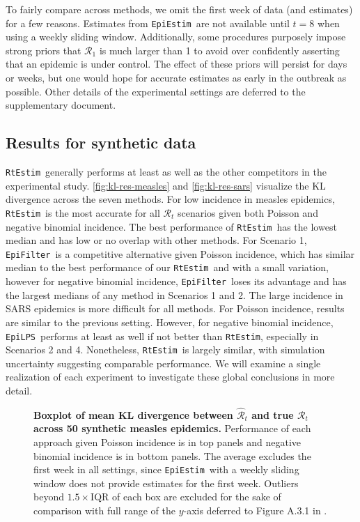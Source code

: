\documentclass[10pt,letterpaper]{article}
\def\RtEstim{\texttt{RtEstim}}
\def\EpiEstim{\texttt{EpiEstim}}
\def\EpiLPS{\texttt{EpiLPS}}
\def\EpiFilter{\texttt{EpiFilter}}
\def\calR{\mathcal{R}}
\renewcommand{\hat}{\widehat}
\begin{document}
To fairly compare across methods, we omit the first week of data (and estimates)
for a few reasons. Estimates from \EpiEstim\ are not available until $t=8$ when
using a weekly sliding window. Additionally, some procedures purposely impose
strong priors that $\calR_1$ is much larger than 1 to avoid over confidently
asserting that an epidemic is under control. The effect of these priors will
persist for days or weeks, but one would hope for accurate estimates as early in
the outbreak as possible. Other details of the experimental settings are
deferred to the supplementary document. 



\subsection{Results for synthetic data}

\RtEstim\ generally performs at least as well as the other competitors in the
experimental study. \autoref{fig:kl-res-measles} and \autoref{fig:kl-res-sars}
visualize the KL divergence across the seven methods. For low incidence in
measles epidemics, \RtEstim\ is the most accurate for all $\calR_t$ scenarios
given both Poisson and negative binomial incidence. The best performance of
\RtEstim\ has the lowest median and has low or no overlap with other methods.
For Scenario 1, \EpiFilter\ is a competitive alternative given Poisson
incidence, which has similar median to the best performance of our \RtEstim\ and
with a small variation, however for negative binomial incidence, \EpiFilter\
loses its advantage and has the largest medians of any method in Scenarios 1 and
2. The large incidence in SARS epidemics is more difficult for all methods. For
Poisson incidence, results are similar to the previous setting. However, for
negative binomial incidence, \EpiLPS\ performs at least as well if not better
than \RtEstim, especially in Scenarios 2 and 4. Nonetheless, \RtEstim\ is
largely similar, with simulation uncertainty suggesting comparable performance.
We will examine a single realization of each
experiment to investigate these global conclusions in more detail.

\begin{figure}[!t]
  \centering
  \caption{{\bf Boxplot of mean KL divergence between $\hat{\calR}_t$ and true
  $\calR_t$ across 50 synthetic measles epidemics.} Performance of each approach given
  Poisson incidence is in top panels and negative binomial incidence is in bottom
  panels. The average excludes the first week in all settings, since
  \EpiEstim\ with a weekly sliding window does not provide estimates for the
  first week. Outliers beyond $1.5\times$IQR of each box are excluded for the
  sake of comparison with full range of the $y$-axis deferred to Figure A.3.1 in
  \nameref{S1_supp}.} 
  \label{fig:kl-res-measles}
\end{figure}
\end{document}
